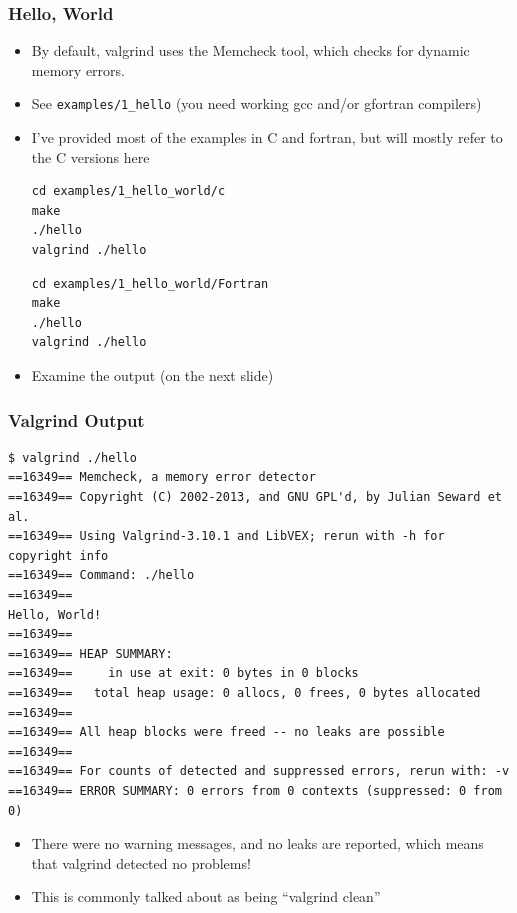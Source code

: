 \documentclass{beamer}
\begin{document}
\begin{frame}[fragile]
\frametitle{Hello, World}
\begin{itemize}
\item By default, valgrind uses the Memcheck tool, which checks for dynamic memory errors.
\item See \texttt{examples/1\_hello} (you need working gcc and/or gfortran compilers)
  \item I've provided most of the examples in C and fortran, but will mostly refer to the C versions here
\begin{lstlisting}
cd examples/1_hello_world/c
make
./hello
valgrind ./hello
\end{lstlisting}
\begin{lstlisting}
cd examples/1_hello_world/Fortran
make
./hello
valgrind ./hello
\end{lstlisting}
\item Examine the output (on the next slide)
\end{itemize}
\end{frame}

\begin{frame}[fragile]
  \frametitle{Valgrind Output}
  \begin{lstlisting}
$ valgrind ./hello
==16349== Memcheck, a memory error detector
==16349== Copyright (C) 2002-2013, and GNU GPL'd, by Julian Seward et al.
==16349== Using Valgrind-3.10.1 and LibVEX; rerun with -h for copyright info
==16349== Command: ./hello
==16349==
Hello, World!
==16349==
==16349== HEAP SUMMARY:
==16349==     in use at exit: 0 bytes in 0 blocks
==16349==   total heap usage: 0 allocs, 0 frees, 0 bytes allocated
==16349==
==16349== All heap blocks were freed -- no leaks are possible
==16349==
==16349== For counts of detected and suppressed errors, rerun with: -v
==16349== ERROR SUMMARY: 0 errors from 0 contexts (suppressed: 0 from 0)
\end{lstlisting}
\begin{itemize}
\item There were no warning messages, and no leaks are reported, which means that valgrind detected no problems!
\item This is commonly talked about as being ``valgrind clean'' 
\end{itemize}



\end{frame}
\end{document}
